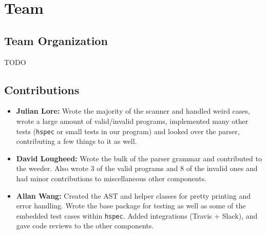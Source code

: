 \documentclass[11pt]{article}
\begin{document}
\section{Team}
\label{sec:org40d12e7}
\subsection{Team Organization}
\label{sec:org4d4f2f8}
TODO
\subsection{Contributions}
\label{sec:orgea5959b}
\begin{itemize}
\item \textbf{Julian Lore:} Wrote the majority of the scanner and handled weird
cases, wrote a large amount of valid/invalid programs, implemented
many other tests (\texttt{hspec} or small tests in our program) and looked
over the parser, contributing a few things to it as well.
\item \textbf{David Lougheed:} Wrote the bulk of the parser grammar and contributed to
the weeder. Also wrote 3 of the valid programs and 8 of the
invalid ones and had minor contributions to miscellaneous other components.
\item \textbf{Allan Wang:} Created the AST and helper classes for pretty printing
and error handling.  Wrote the base package for testing as well as
some of the embedded test cases within \texttt{hspec}.  Added integrations
(Travis + Slack), and gave code reviews to the other components.
\end{itemize}
\end{document}
